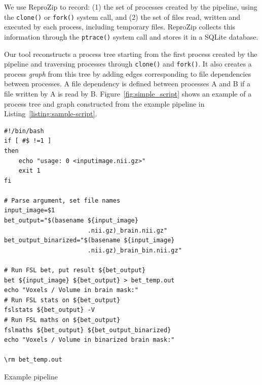 \documentclass[a4paper,num-refs]{oup-contemporary}
\newcommand{\reprozip}[0]{ReproZip\xspace}
\begin{document}
We use \reprozip to record: (1) the set of processes created by the
pipeline, using the \texttt{clone()} or \texttt{fork()} system call, and
(2) the set of files read, written and executed by each process, including
temporary files. \reprozip collects this information through the
\texttt{ptrace()} system call and stores it in a SQLite database.

Our tool reconstructs a process tree starting from the first process
created by the pipeline and traversing processes through \texttt{clone()}
and \texttt{fork()}. It also creates a process \emph{graph} from this tree
by adding edges corresponding to file dependencies between processes. A
file dependency is defined between processes A and B if a file written by A
is read by B. Figure~\ref{fig:simple_script} shows an example of a process
tree and graph constructed from the example pipeline in
Listing~\ref{listing:sample-script}.
\begin{listing}
\begin{verbatim}
#!/bin/bash
if [ #$ !=1 ]
then
    echo "usage: 0 <inputimage.nii.gz>"
    exit 1
fi

# Parse argument, set file names
input_image=$1
bet_output="$(basename ${input_image} 
                       .nii.gz)_brain.nii.gz"
bet_output_binarized="$(basename ${input_image} 
                       .nii.gz)_brain_bin.nii.gz"

# Run FSL bet, put result ${bet_output}
bet ${input_image} ${bet_output} > bet_temp.out
echo "Voxels / Volume in brain mask:"
# Run FSL stats on ${bet_output}
fslstats ${bet_output} -V
# Run FSL maths on ${bet_output}
fslmaths ${bet_output} ${bet_output_binarized}
echo "Voxels / Volume in binarized brain mask:"

\rm bet_temp.out
\end{verbatim}
  \caption{Example pipeline}
  \label{listing:sample-script}
\end{listing}
\end{document}
